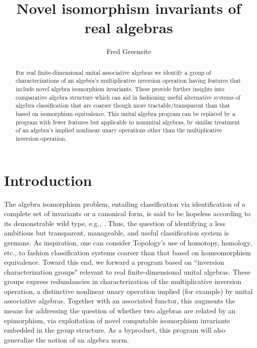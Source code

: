 \documentclass{amsart}
\numberwithin{equation}{section}
\theoremstyle{definition}
\numberwithin{theorem}{section}
\begin{document}
       
             \title{Novel isomorphism invariants of real algebras}
    \author{Fred Greensite}
    
   \begin{abstract}  For real finite-dimensional unital associative algebras we identify a group of characterizations of an algebra's multiplicative inversion operation having features that include novel algebra isomorphism invariants.  These provide further insights into comparative algebra structure which can aid in fashioning useful alternative systems of algebra classification that are coarser though more tractable/transparent than that based on isomorphism equivalence.  This unital algebra program can be replaced by a program with fewer features but applicable to nonunital algebras, by similar treatment of an algebra's implied nonlinear unary operations other than the multiplicative inversion operation.
   \end{abstract}
        
  \maketitle
  
 
  \section{Introduction} The algebra isomorphism problem, entailing classification via identification of a complete set of invariants or a canonical form, is said to be hopeless according to its demonstrable wild type, e.g., \cite{drozd:1972,prest:1991,belitskii:2005}. Thus, the question of identifying a  less ambitious but transparent, manageable, and useful classification system is germane.  As inspiration, one can consider Topology's use of homotopy, homology, etc., to fashion classification systems coarser than that based on homeomorphism equivalence.  Toward this end, we forward a program based on  ``inversion characterization groups" relevant to real finite-dimensional unital algebras.  These groups express redundancies in characterization of the multiplicative inversion operation, a distinctive nonlinear unary operation implied (for example) by unital associative algebras. Together with an associated functor, this augments the means for addressing the question of whether two algebras are related by an epimorphism, via exploitation of novel computable isomorphism invariants embedded in the group structure. 
    As a byproduct, this program will also generalize the notion of an algebra norm. 
  
\end{document}
